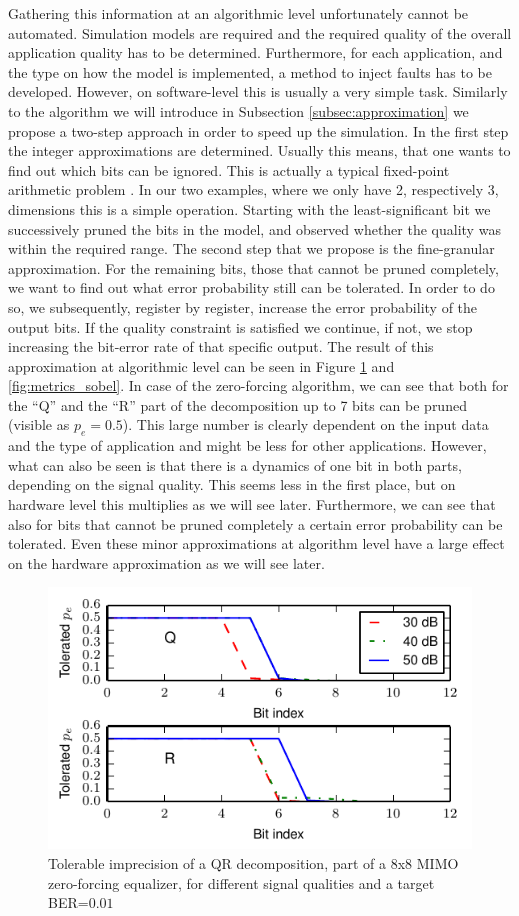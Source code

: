 \documentclass[conference]{IEEEtran}
\begin{document}
Gathering this information at an algorithmic level unfortunately cannot be automated. Simulation models are required and the required quality of the overall application quality has to be determined. Furthermore, for each application, and the type on how the model is implemented, a method to inject faults has to be developed. However, on software-level this is usually a very simple task. Similarly to the algorithm we will introduce in Subsection \ref{subsec:approximation} we propose a two-step approach in order to speed up the simulation. In the first step the integer approximations are determined. Usually this means, that one wants to find out which bits can be ignored. This is actually a typical fixed-point arithmetic problem \cite{yates2009fixed}. In our two examples, where we only have 2, respectively 3, dimensions this is a simple operation. Starting with the least-significant bit we successively pruned the bits in the model, and observed whether the quality was within the required range. The second step that we propose is the fine-granular approximation. For the remaining bits, those that cannot be pruned completely, we want to find out what error probability still can be tolerated. In order to do so, we subsequently, register by register, increase the error probability of the output bits. If the quality constraint is satisfied we continue, if not, we stop increasing the bit-error rate of that specific output. The result of this approximation at algorithmic level can be seen in Figure \ref{fig:metrics_qr} and \ref{fig:metrics_sobel}. In case of the zero-forcing algorithm, we can see that both for the ``Q'' and the ``R'' part of the decomposition up to 7 bits can be pruned (visible as $p_e=0.5$). This large number is clearly dependent on the input data and the type of application and might be less for other applications. However, what can also be seen is that there is a dynamics of one bit in both parts, depending on the signal quality. This seems less in the first place, but on hardware level this multiplies as we will see later. Furthermore, we can see that also for bits that cannot be pruned completely a certain error probability can be tolerated. Even these minor approximations at algorithm level have a large effect on the hardware approximation as we will see later.
\begin{figure}[tb]
  \centering
  \includegraphics[width=.5\textwidth]{figs/metrics_qr}
  \caption{Tolerable imprecision of a QR decomposition, part of a 8x8 MIMO zero-forcing equalizer, for different signal qualities and a target BER=$0.01$}
  \label{fig:metrics_qr}
\end{figure}
\end{document}
